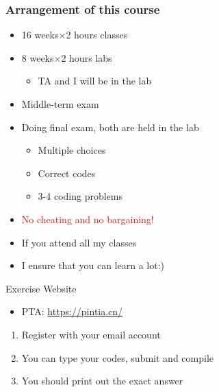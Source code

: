\begin{frame}
	\frametitle{Arrangement of this course}
\begin{itemize}
	\item {16 weeks${\times}$2 hours classes}
	\item {8 weeks${\times}$2 hours labs}
	\begin{itemize}
			\item {TA and I will be in the lab}
	\end{itemize}
	\item {Middle-term exam}
	\item {Doing final exam, both are held in the lab}
	\begin{itemize}
		\item {Multiple choices}	
		\item {Correct codes}
		\item {3-4 coding problems}
	\end{itemize}
	\item {\textcolor{red}{No cheating and no bargaining!}}
	\item {If you attend all my classes}
	\item {I ensure that you can learn a lot:)}
\end{itemize}
\end{frame}


\begin{frame}{Exercise Website}
\begin{itemize}
	\item{PTA: \url{https://pintia.cn/}}
\end{itemize}


\begin{enumerate}
	\item {Register with your email account}
	\item {You can type your codes, submit and compile}
	\item {You should print out the exact answer}
\end{enumerate}

\end{frame}